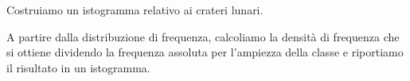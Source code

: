 \begin{esempio}
Costruiamo un istogramma relativo ai crateri lunari.

A partire dalla distribuzione di frequenza, calcoliamo la densità di 
frequenza che si ottiene dividendo la frequenza assoluta per l'ampiezza della 
classe e riportiamo il risultato in un istogramma.


% 

\end{esempio}

